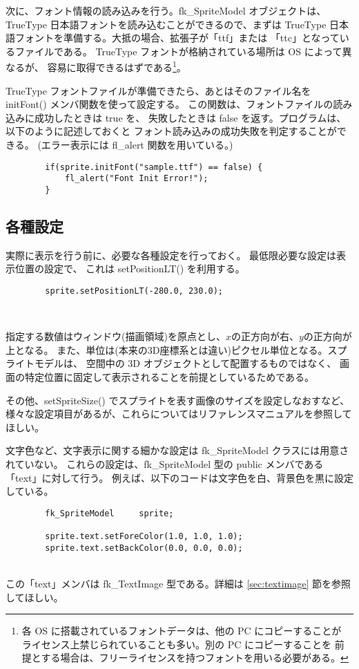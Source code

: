 次に、フォント情報の読み込みを行う。fk\_SpriteModel オブジェクトは、
TrueType 日本語フォントを読み込むことができるので、まずは TrueType
日本語フォントを準備する。大抵の場合、拡張子が「ttf」または
「ttc」となっているファイルである。
TrueType フォントが格納されている場所は OS によって異なるが、
容易に取得できるはずである\footnote{
各 OS に搭載されているフォントデータは、他の PC にコピーすることが
ライセンス上禁じられていることも多い。別の PC にコピーすることを
前提とする場合は、フリーライセンスを持つフォントを用いる必要がある。}。

TrueType フォントファイルが準備できたら、あとはそのファイル名を
initFont() メンバ関数を使って設定する。
この関数は、フォントファイルの読み込みに成功したときは true を、
失敗したときは false を返す。プログラムは、以下のように記述しておくと
フォント読み込みの成功失敗を判定することができる。
(エラー表示には fl\_alert 関数を用いている。)
\\
\begin{screen}
\begin{verbatim}
        if(sprite.initFont("sample.ttf") == false) {
            fl_alert("Font Init Error!");
        }
\end{verbatim}
\end{screen}
\subsection{各種設定}
実際に表示を行う前に、必要な各種設定を行っておく。
最低限必要な設定は表示位置の設定で、
これは setPositionLT() を利用する。
\\
\begin{screen}
\begin{verbatim}
        sprite.setPositionLT(-280.0, 230.0);
\end{verbatim}
\end{screen}
~

指定する数値はウィンドウ(描画領域)を原点とし、\(x\)の正方向が右、\(y\)の正方向が上となる。
また、単位は(本来の3D座標系とは違い)ピクセル単位となる。スプライトモデルは、
空間中の 3D オブジェクトとして配置するものではなく、
画面の特定位置に固定して表示されることを前提としているためである。

その他、setSpriteSize() でスプライトを表す画像のサイズを設定しなおすなど、
様々な設定項目があるが、これらについてはリファレンスマニュアルを参照してほしい。

文字色など、文字表示に関する細かな設定は fk\_SpriteModel クラスには用意されていない。
これらの設定は、fk\_SpriteModel 型の public メンバである「text」に対して行う。
例えば、以下のコードは文字色を白、背景色を黒に設定している。
\\
\begin{screen}
\begin{verbatim}
        fk_SpriteModel     sprite;

        sprite.text.setForeColor(1.0, 1.0, 1.0);
        sprite.text.setBackColor(0.0, 0.0, 0.0);
\end{verbatim}
\end{screen}
~ \\
この「text」メンバは fk\_TextImage 型である。詳細は \ref{sec:textimage} 節を参照してほしい。

